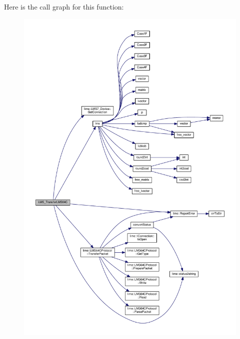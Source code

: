 Here is the call graph for this function\+:
\nopagebreak
\begin{figure}[H]
\begin{center}
\leavevmode
\includegraphics[width=350pt]{df/de1/lms7__api_8cpp_acdd37504896783997722571ef56f0717_cgraph}
\end{center}
\end{figure}


